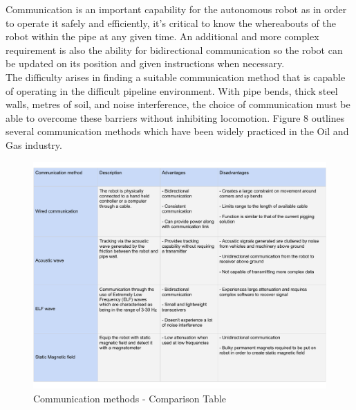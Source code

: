 \documentclass[11pt]{article}		%
\begin{document}
		Communication is an important capability for the autonomous robot as in order to operate it safely and efficiently, it's critical to know the whereabouts of the robot within the pipe at any given time. An additional and more complex requirement is also the ability for bidirectional communication so the robot can be updated on its position and given instructions when necessary. \\
	    \hspace*{3ex}The difficulty arises in finding a suitable communication method that is capable of operating in the difficult pipeline environment. With pipe bends, thick steel walls, metres of soil, and noise interference, the choice of communication must be able to overcome these barriers without inhibiting locomotion. Figure 8 outlines several communication methods which have been widely practiced in the Oil and Gas industry. 
        \cite{acoustic2020} \\
        \begin{figure}[h]
			\centering
			\includegraphics[scale=0.6]{commstable.pdf}
			\caption{Communication methods - Comparison Table}
			\label{comparison comms}
		\end{figure}
\end{document}
